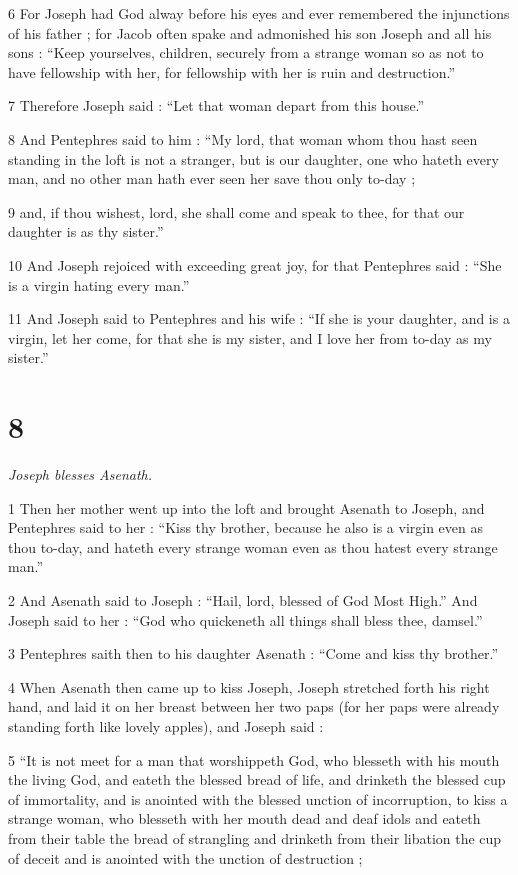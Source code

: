 6 For Joseph had God alway before his eyes and ever remembered the injunctions of his father ; for Jacob often spake and admonished his son Joseph and all his sons : “Keep yourselves, children, securely from a strange woman so as not to have fellowship with her, for fellowship with her is ruin and destruction.” 

7 Therefore Joseph said : “Let that woman depart from this house.” 

8 And Pentephres said to him : “My lord, that woman whom thou hast seen standing in the loft is not a stranger, but is our daughter, one who hateth every man, and no other man hath ever seen her save thou only to-day ; 

9 and, if thou wishest, lord, she shall come and speak to thee, for that our daughter is as thy sister.” 

10 And Joseph rejoiced with exceeding great joy, for that Pentephres said : “She is a virgin hating every man.” 

11 And Joseph said to Pentephres and his wife : “If she is your daughter, and is a virgin, let her come, for that she is my sister, and I love her from to-day as my sister.”

\chapter{8}


\par \textit{Joseph blesses Asenath.}

1 Then her mother went up into the loft and brought Asenath to Joseph, and Pentephres said to her : “Kiss thy brother, because he also is a virgin even as thou to-day, and hateth every strange woman even as thou hatest every strange man.” 

2 And Asenath said to Joseph : “Hail, lord, blessed of God Most High.” And Joseph said to her : “God who quickeneth all things shall bless thee, damsel.” 

3 Pentephres saith then to his daughter Asenath : “Come and kiss thy brother.” 

4 When Asenath then came up to kiss Joseph, Joseph stretched forth his right hand, and laid it on her breast between her two paps (for her paps were already standing forth like lovely apples), and Joseph said : 

5 “It is not meet for a man that worshippeth God, who blesseth with his mouth the living God, and eateth the blessed bread of life, and drinketh the blessed cup of immortality, and is anointed with the blessed unction of incorruption, to kiss a strange woman, who blesseth with her mouth dead and deaf idols and eateth from their table the bread of strangling and drinketh from their libation the cup of deceit and is anointed with the unction of destruction ; 

